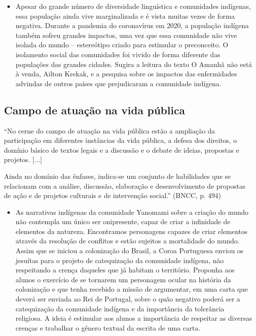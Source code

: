 \documentclass[12pt]{extarticle}
\begin{document}
\begin{itemize}
\item
  Apesar do grande número de diversidade linguística e comunidades
  indígenas, essa população ainda vive marginalizada e é vista muitas
  vezes de forma negativa. Durante a pandemia do coronavírus em 2020, a
  população indígena também sofreu grandes impactos, uma vez que essa
  comunidade não vive isolada do mundo -- estereótipo criado para
  estimular o preconceito. O isolamento social das comunidades foi
  vivido de forma diferente das populações das grandes cidades. Sugira a
  leitura do texto O Amanhã não está à venda, Ailton Krekak, e a
  pesquisa sobre os impactos das enfermidades advindas de outros países
  que prejudicaram a comunidade indígena.
\end{itemize}


\subsection{Campo de atuação na vida pública}

``No cerne do campo de atuação na vida pública estão a ampliação da
participação em diferentes instâncias da vida pública, a defesa dos
direitos, o domínio básico de textos legais e a discussão e o debate de
ideias, propostas e projetos. {[}...{]}

Ainda no domínio das ênfases, indica-se um conjunto de habilidades que
se relacionam com a análise, discussão, elaboração e desenvolvimento de
propostas de ação e de projetos culturais e de intervenção social.''
(BNCC, p. 494)

\begin{itemize}
\item
  As narrativas indígenas da comunidade Yanomami sobre a criação do
  mundo não contempla um único ser onipresente, capaz de criar a
  infinidade de elementos da natureza. Encontramos personagens capazes
  de criar elementos através da resolução de conflitos e estão sujeitos
  a mortalidade do mundo. Assim que se iniciou a colonização do Brasil,
  a Coroa Portuguesa enviou os jesuítas para o projeto de catequização
  da comunidade indígena, não respeitando a crença daqueles que já
  habitam o território. Proponha aos alunos o exercício de se tornarem
  um personagem ocular na história da colonização e que tenha recebido a
  missão de argumentar, em uma carta que deverá ser enviada ao Rei de
  Portugal, sobre o quão negativo poderá ser a catequização da
  comunidade indígena e da importância da tolerância religiosa. A ideia
  é estimular aos alunos a importância de respeitar as diversas crenças
  e trabalhar o gênero textual da escrita de uma carta.
\end{itemize}
\end{document}
